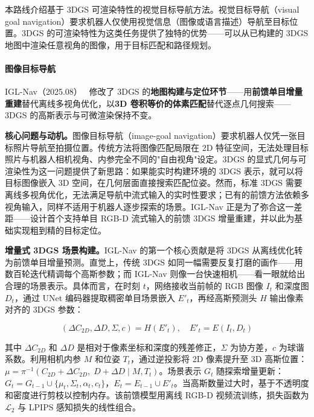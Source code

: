 本路线介绍基于 3DGS 可渲染特性的视觉目标导航方法。视觉目标导航（visual goal navigation）要求机器人仅使用视觉信息（图像或语言描述）导航至目标位置。3DGS 的可渲染特性为这类任务提供了独特的优势——可以从已构建的 3DGS 地图中渲染任意视角的图像，用于目标匹配和路径规划。

\paragraph{图像目标导航}

IGL-Nav（2025.08）~\cite{2508_00823} 修改了 3DGS 的\textbf{地图构建与定位环节}——用\textbf{前馈单目增量重建}替代离线多视角优化，以\textbf{3D 卷积等价的体素匹配}替代逐点几何搜索——3DGS 的高斯表示与可微渲染保持不变。

\textbf{核心问题与动机。}图像目标导航（image-goal navigation）要求机器人仅凭一张目标照片导航至拍摄位置。传统方法将图像匹配局限在 2D 特征空间，无法处理目标照片与机器人相机视角、内参完全不同的"自由视角"设定。3DGS 的显式几何与可渲染性为这一问题提供了新思路：如果能实时构建环境的 3DGS 表示，就可以将目标图像嵌入 3D 空间，在几何层面直接搜索匹配位姿。然而，标准 3DGS 需要离线多视角优化，无法满足导航中流式输入的实时性要求；已有的前馈方法依赖多视角输入，同样不适用于机器人逐步探索的场景。IGL-Nav 正是为了弥合这一差距——设计首个支持单目 RGB-D 流式输入的前馈 3DGS 增量重建，并以此为基础实现粗到精的目标定位。

\textbf{增量式 3DGS 场景构建。}IGL-Nav 的第一个核心贡献是将 3DGS 从离线优化转为前馈单目增量预测。直觉上，传统 3DGS 如同一幅需要反复打磨的画作——用数百轮迭代精调每个高斯参数；而 IGL-Nav 则像一台快速相机——看一眼就给出合理的场景表示。具体而言，在时刻 $t$，网络接收当前帧的 RGB 图像 $I_t$ 和深度图 $D_t$，通过 UNet 编码器提取稠密单目场景嵌入 $E'_t$，再经高斯预测头 $H$ 输出像素对齐的 3DGS 参数：

\begin{equation}
(\Delta C_{2D}, \Delta D, \Sigma, c) = H(E'_t), \quad E'_t = E(I_t, D_t)
\end{equation}

其中 $\Delta C_{2D}$ 和 $\Delta D$ 是相对于像素坐标和深度的残差修正，$\Sigma$ 为协方差，$c$ 为球谐系数。利用相机内参 $M$ 和位姿 $T_t$，通过逆投影将 2D 像素提升至 3D 高斯位置：$\mu = \pi^{-1}(C_{2D} + \Delta C_{2D},\; D + \Delta D \mid M, T_t)$。场景表示 $G_t$ 随探索增量更新：$G_t = G_{t-1} \cup \{\mu_t, \Sigma_t, \alpha_t, c_t\}$，$E_t = E_{t-1} \cup E'_t$。当高斯数量过大时，基于不透明度和密度进行剪枝以控制内存。该前馈模型用离线 RGB-D 视频流训练，损失函数为 $\mathcal{L}_2$ 与 LPIPS 感知损失的线性组合。

